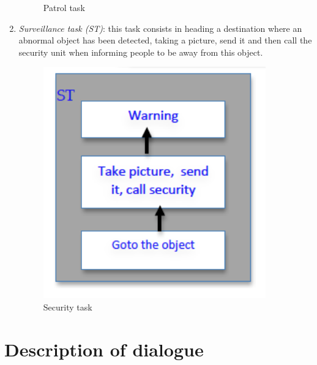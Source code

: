 \documentclass{article}
\begin{document}
\begin{enumerate}
\begin{figure}[htbp]
\begin{center}
\caption{Patrol task }
\label{FigPatrolTask}
\end{center}
\end{figure}
\item {\it Surveillance task (ST)}: this task consists in heading a destination where an abnormal object has been detected, taking a picture, send it and then call the security unit when informing people to be away from this object. 
\begin{figure}[htbp]
\begin{center}
\includegraphics[height=10cm]{SecurityTask}
\caption{Security  task }
\label{FigsecurityTask}
\end{center}
\end{figure}
\end{enumerate}

\section{Description of dialogue}
\end{document}
